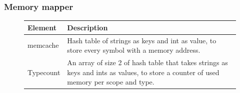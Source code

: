 \subsubsection{Memory mapper}

\begin{figure}[H]
    \centering
    \begin{tabular}{p{1in}p{3in}}
        \toprule
        \textbf{Element} & \textbf{Description}\\
        \midrule memcache &
        Hash table of strings as keys and int as value, to store every symbol
        with a memory address.\\

        \midrule Typecount &
        An array of size 2 of hash table that takes strings as keys and ints as
        values, to store a counter of used memory per scope and type.\\

        \bottomrule
    \end{tabular}\\
\end{figure}
